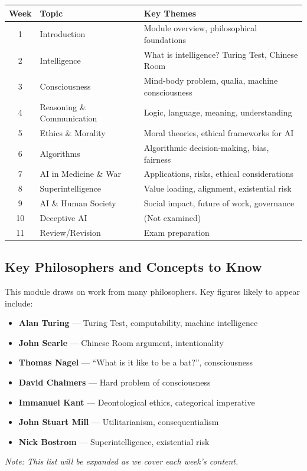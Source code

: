 \begin{center}
\renewcommand{\arraystretch}{1.3}
\begin{tabular}{@{} c l p{7cm} @{}}
\toprule
\textbf{Week} & \textbf{Topic} & \textbf{Key Themes} \\
\midrule
1 & Introduction & Module overview, philosophical foundations \\
2 & Intelligence & What is intelligence? Turing Test, Chinese Room \\
3 & Consciousness & Mind-body problem, qualia, machine consciousness \\
4 & Reasoning \& Communication & Logic, language, meaning, understanding \\
5 & Ethics \& Morality & Moral theories, ethical frameworks for AI \\
6 & Algorithms & Algorithmic decision-making, bias, fairness \\
7 & AI in Medicine \& War & Applications, risks, ethical considerations \\
8 & Superintelligence & Value loading, alignment, existential risk \\
9 & AI \& Human Society & Social impact, future of work, governance \\
10 & Deceptive AI & (Not examined) \\
11 & Review/Revision & Exam preparation \\
\bottomrule
\end{tabular}
\end{center}

\separator

\subsection*{Key Philosophers and Concepts to Know}

This module draws on work from many philosophers. Key figures likely to appear include:

\begin{itemize}
  \item \textbf{Alan Turing} --- Turing Test, computability, machine intelligence
  \item \textbf{John Searle} --- Chinese Room argument, intentionality
  \item \textbf{Thomas Nagel} --- ``What is it like to be a bat?'', consciousness
  \item \textbf{David Chalmers} --- Hard problem of consciousness
  \item \textbf{Immanuel Kant} --- Deontological ethics, categorical imperative
  \item \textbf{John Stuart Mill} --- Utilitarianism, consequentialism
  \item \textbf{Nick Bostrom} --- Superintelligence, existential risk
\end{itemize}

\textit{Note: This list will be expanded as we cover each week's content.}


